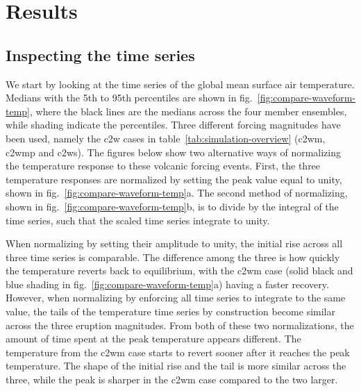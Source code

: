 \documentclass{ametsocV6.1}
\begin{document}
\section{Results}\label{sec:results}


\subsection{Inspecting the time series}

We start by looking at the time series of the global mean surface air temperature.
Medians with the 5th to 95th percentiles are shown in
fig.~\ref{fig:compare-waveform-temp}, where the black lines are the medians across the
four member ensembles, while shading indicate the percentiles. Three different forcing
magnitudes have been used, namely the \gls{c2w} cases in
table~\ref{tab:simulation-overview} (\gls{c2wm}, \gls{c2wmp} and \gls{c2ws}). The
figures below show two alternative ways of normalizing the temperature response to these
volcanic forcing events. First, the three temperature responses are normalized by
setting the peak value equal to unity, shown in fig.~\ref{fig:compare-waveform-temp}a.
The second method of normalizing, shown in fig.~\ref{fig:compare-waveform-temp}b, is to
divide by the integral of the time series, such that the scaled time series integrate to
unity.

When normalizing by setting their amplitude to unity, the initial rise across all three
time series is comparable. The difference among the three is how quickly the temperature
reverts back to equilibrium, with the \gls{c2wm} case (solid black and blue shading in
fig.~\ref{fig:compare-waveform-temp}a) having a faster recovery. However, when
normalizing by enforcing all time series to integrate to the same value, the tails of
the temperature time series by construction become similar across the three eruption
magnitudes. From both of these two normalizations, the amount of time spent at the peak
temperature appears different. The temperature from the \gls{c2wm} case starts to revert
sooner after it reaches the peak temperature. The shape of the initial rise and the tail
is more similar across the three, while the peak is sharper in the \gls{c2wm} case
compared to the two larger.
\end{document}
